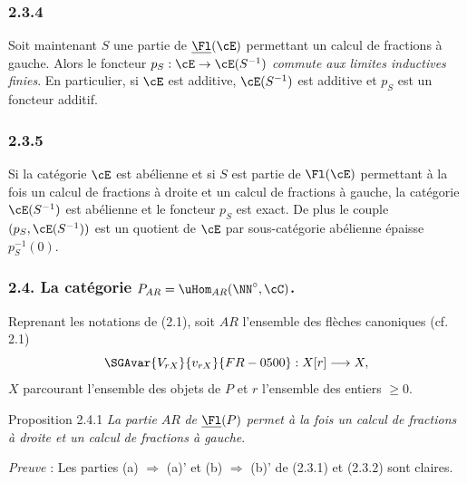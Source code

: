 \subsubsection*{2.3.4}
Soit maintenant $S$ une partie de $\underline{\Fl}(\cE)$ permettant un calcul de fractions à gauche. Alors le foncteur $p_S:\cE\to\cE(S^{-1})$ \emph{commute aux limites inductives finies}. En particulier, si $\cE$ est additive, $\cE(S^{-1})$ est additive et $p_S$ est un foncteur additif.

\subsubsection*{2.3.5}
Si la
catégorie $\cE$ est abélienne et si $S$ est  partie de $\Fl(\cE)$ permettant à la fois un calcul de fractions à droite et un calcul de fractions à gauche, la catégorie $\cE(S^{-1})$ est abélienne et le foncteur $p_S$ est exact. De plus le couple $(p_S,\cE(S^{-1}))$ est un quotient de $\cE$ par sous-catégorie abélienne épaisse $p_S^{-1}(0)$.

\subsubsection*{2.4. La catégorie $P_{AR}=\uHom_{AR}(\NN^\circ,\cC)$.}
Reprenant les notations de (2.1), soit $AR$ l'ensemble des flèches canoniques (cf. 2.1)
\[
\SGAvar{V_{rX}}{v_{rX}}{FR-0500}:X[r]\longrightarrow X,
\]
$X$ parcourant l'ensemble des objets de $P$ et $r$ l'ensemble des entiers $\ge0$.

\begin{statement}{Proposition 2.4.1}
\emph{La partie} $AR$ \emph{de} $\underline{\Fl}(P)$ \emph{permet à la fois un calcul de fractions à droite et un calcul de fractions à gauche}.
\end{statement}

\emph{Preuve} : Les parties (a) $\Rightarrow$ (a)' et (b) $\Rightarrow$ (b)' de (2.3.1) et (2.3.2) sont claires.

